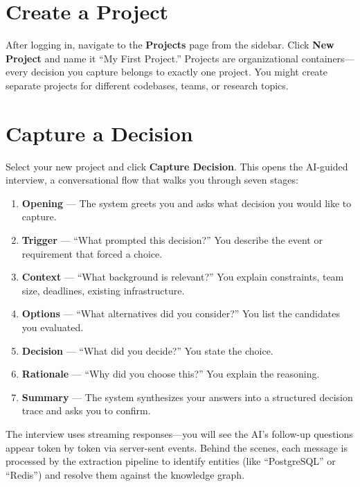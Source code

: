 \section{Create a Project}
\label{sec:create-project}

After logging in, navigate to the \textbf{Projects} page from the sidebar.
Click \textbf{New Project} and name it ``My First Project.''  Projects are
organizational containers---every decision you capture belongs to exactly one
project.  You might create separate projects for different codebases, teams, or
research topics.


\section{Capture a Decision}
\label{sec:capture-decision}

Select your new project and click \textbf{Capture Decision}.  This opens the
AI-guided interview, a conversational flow that walks you through seven stages:

\begin{enumerate}
    \item \textbf{Opening} --- The system greets you and asks what decision you
          would like to capture.
    \item \textbf{Trigger} --- ``What prompted this decision?''  You describe
          the event or requirement that forced a choice.
    \item \textbf{Context} --- ``What background is relevant?''  You explain
          constraints, team size, deadlines, existing infrastructure.
    \item \textbf{Options} --- ``What alternatives did you consider?''  You list
          the candidates you evaluated.
    \item \textbf{Decision} --- ``What did you decide?''  You state the choice.
    \item \textbf{Rationale} --- ``Why did you choose this?''  You explain the
          reasoning.
    \item \textbf{Summary} --- The system synthesizes your answers into a
          structured decision trace and asks you to confirm.
\end{enumerate}

The interview uses streaming responses---you will see the AI's follow-up
questions appear token by token via server-sent events.  Behind the scenes, each
message is processed by the extraction pipeline to identify entities (like
``PostgreSQL'' or ``Redis'') and resolve them against the knowledge graph.

